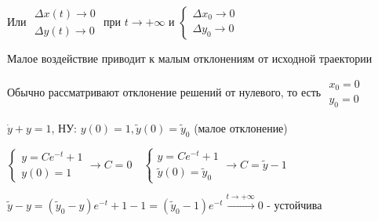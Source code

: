 \documentclass[12pt]{article}
\begin{document}
    Или $\begin{matrix}\Delta x (t) \to 0 \\ \Delta y (t) \to 0\end{matrix}$ при $t \to +\infty$ и $\displaystyle \begin{cases}\Delta x_0 \to 0 \\ \Delta y_0 \to 0\end{cases}$

    \Nota Малое воздействие приводит к малым отклонениям от исходной траектории

    \Nota Обычно рассматривают отклонение решений от нулевого, то есть $\displaystyle \begin{matrix}x_0 = 0 \\ y_0 = 0\end{matrix}$

    \Ex $\dot y + y = 1$, НУ: $\displaystyle y(0) = 1, \tilde{y}(0) = \tilde{y}_0$ (малое отклонение)

    $\displaystyle \begin{cases}y = Ce^{-t} + 1 \\ y(0) = 1\end{cases} \rightarrow C = 0 \quad
    \begin{cases}y = Ce^{-t} + 1 \\ \tilde{y}(0) = \tilde{y}_0\end{cases} \to C = \tilde{y} - 1$

    $\displaystyle \tilde{y} - y = (\tilde{y}_0 - y) e^{-t} + 1 - 1 = (\tilde{y}_0 - 1)e^{-t} \stackrel{t \to +\infty}{\longrightarrow} 0$ - устойчива{\huge 🥳}
\end{document}
